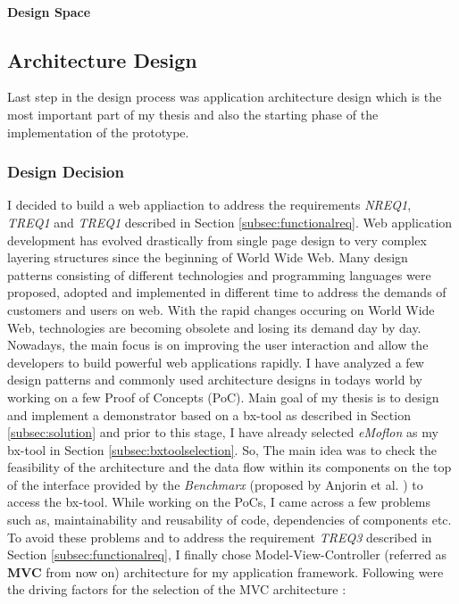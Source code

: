 \paragraph{Design Space} 

\subsection{Architecture Design}\label{subsec:architecturedesign}
Last step in the design process was application architecture design which is the most important part of my thesis and also the starting phase of the implementation of the prototype.
\subsubsection{Design Decision}\label{subsubsec:architecturedesigndecision}
I decided to build a web appliaction to address the requirements \textit{NREQ1}, \textit{TREQ1} and \textit{TREQ1} described in Section \ref{subsec:functionalreq}.
\newline\newline Web application development has evolved drastically from single page design to very complex layering structures since the beginning of World Wide Web. Many design patterns \cite{designpattern} \cite{designpattern-notes} consisting of different technologies and programming languages were proposed, adopted and implemented in different time to address the demands of customers and users on web. With the rapid changes occuring on World Wide Web, technologies are becoming obsolete and losing its demand day by day. Nowadays, the main focus is on improving the user interaction and allow the developers to build powerful web applications rapidly.
\newline\newline I have analyzed a few design patterns and commonly used architecture designs in todays world by working on a few Proof of Concepts (PoC). Main goal of my thesis is to design and implement a demonstrator based on a bx-tool as described in Section \ref{subsec:solution} and prior to this stage, I have already selected \textit{eMoflon} as my bx-tool in Section \ref{subsec:bxtoolselection}. So, The main idea was to check the feasibility of the architecture and the data flow within its components on the top of the interface provided by the \textit{Benchmarx} (proposed by Anjorin et al. \cite{benchmarx-reload}) to access the bx-tool. While working on the PoCs, I came across a few problems such as, maintainability and reusability of code, dependencies of components etc. To avoid these problems and to address the requirement \textit{TREQ3} described in Section \ref{subsec:functionalreq}, I finally chose Model-View-Controller (referred as \textbf{MVC} from now on) architecture for my application framework. Following were the driving factors for the selection of the MVC architecture \cite{designpattern-notes} \cite{designpattern-headfirst} :
